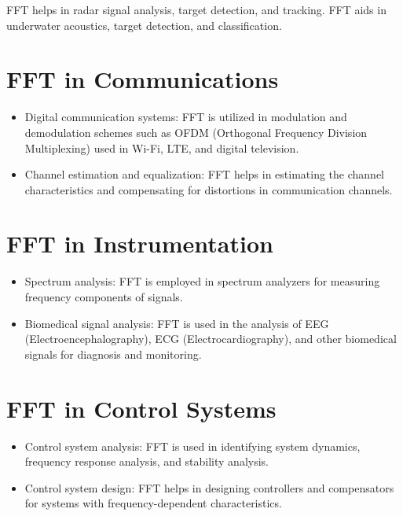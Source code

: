 \documentclass{report}
\begin{document}
FFT helps in radar signal analysis, target detection, and tracking. FFT aids in underwater acoustics, target detection, and classification. 
\section{FFT in Communications}
    \begin{itemize}[]
            \item Digital communication systems: FFT is utilized in modulation and demodulation schemes such as OFDM (Orthogonal Frequency Division Multiplexing) used in Wi-Fi, LTE, and digital television.
            \item Channel estimation and equalization: FFT helps in estimating the channel characteristics and compensating for distortions in communication channels.
    \end{itemize}
\section{FFT in Instrumentation}
\begin{itemize}[]
            \item Spectrum analysis: FFT is employed in spectrum analyzers for measuring frequency components of signals.
            \item Biomedical signal analysis: FFT is used in the analysis of EEG (Electroencephalography), ECG (Electrocardiography), and other biomedical signals for diagnosis and monitoring.
        \end{itemize}
\section{FFT in Control Systems}
    \begin{itemize}[]
            \item Control system analysis: FFT is used in identifying system dynamics, frequency response analysis, and stability analysis.
            \item Control system design: FFT helps in designing controllers and compensators for systems with frequency-dependent characteristics.
    \end{itemize}
\end{document}
